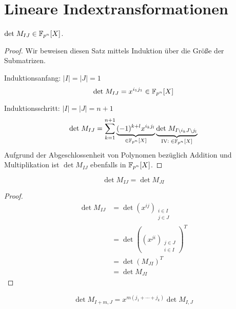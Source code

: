 \section{Lineare Indextransformationen}

\begin{lemma} \label{lemma:det-polynom}
    $\mathrm{det}\; M_{IJ} \in \mathbb{F}_{p^n}[X]$.
\end{lemma}

\begin{proof}
    Wir beweisen diesen Satz mittels Induktion über die Größe der Submatrizen. 

    Induktionsanfang: $|I| = |J| = 1$
    \begin{equation*}
        \mathrm{det}\; M_{IJ} = x^{i_1j_1} \in \mathbb{F}_{p^n}[X]
    \end{equation*}

    Induktionsschritt: $|I| = |J| = n+1$
    \begin{equation*}
        \mathrm{det}\; M_{IJ} = \sum_{k=1}^{n+1} \underbrace{(-1)^{k+l} x^{i_kj_l}}_{\in \mathbb{F}_{p^n}[X]} \underbrace{\mathrm{det}\; M_{I\backslash i_k J \backslash j_l}}_{\mathrm{IV:}\; \in \mathbb{F}_{p^n}[X]}
    \end{equation*}
    Aufgrund der Abgeschlossenheit von Polynomen bezüglich Addition und Multiplikation ist $\det M_{IJ}$ ebenfalls in $\mathbb{F}_{p^n}[X]$.
\end{proof}

\begin{lemma} \label{lemma:transpose}
    \begin{equation*}
        \det M_{IJ} = \det M_{JI}
    \end{equation*}
\end{lemma}

\begin{proof}
    \begin{align*}
        \det M_{IJ} &= \det (x^{ij})_{\substack{i\in I \\ j\in J}} \\
                    &= \det \left( (x^{ji})_{\substack{j\in J \\ i\in I}} \right)^T \\
                    &= \det \left( M_{JI} \right)^T \\
                    &= \det M_{JI}
    \end{align*}
\end{proof}

\begin{lemma} \label{lemma:translation}
    \begin{equation*}
        \det{} M_{I+m,J} = x^{m(j_1+\cdots +j_k)} \det M_{I,J}
    \end{equation*}
\end{lemma}

